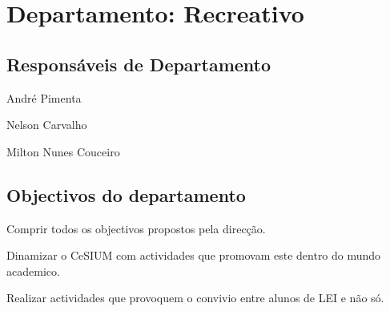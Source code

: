 \section{Departamento: Recreativo}

\subsection{Responsáveis de Departamento}
\begin{itemizedash}
	\item André Pimenta
	\item Nelson Carvalho
	\item Milton Nunes Couceiro
\end{itemizedash}

\subsection{Objectivos do departamento}
\lipsum[2]
\begin{itemizedash}
	\item Comprir todos os objectivos propostos pela direcção.
	\item Dinamizar o CeSIUM com actividades que promovam este dentro do  mundo academico.
	\item Realizar actividades que provoquem o convivio entre alunos de LEI e não só.
\end{itemizedash}
